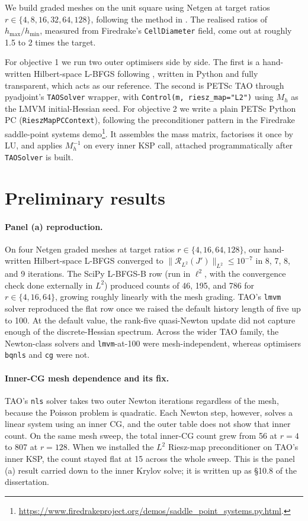 \documentclass[a4paper,11pt]{article}
\newcommand{\Rmap}{\mathcal{R}}
\begin{document}
We build graded meshes on the unit square using Netgen \citep{schoeberl1997} at target ratios $r \in \{4, 8, 16, 32, 64, 128\}$, following the method in \citet[Sect. 2.3]{shfp2017}. The realised ratios of $h_{\max}/h_{\min}$, measured from Firedrake's \texttt{CellDiameter} field, come out at roughly 1.5 to 2 times the target.

For objective 1 we run two outer optimisers side by side. The first is a hand-written Hilbert-space L-BFGS following \citet[Sect. 1.5.4.1]{shfp2017}, written in Python and fully transparent, which acts as our reference. The second is PETSc TAO through pyadjoint's \texttt{TAOSolver} wrapper, with \texttt{Control(m, riesz\_map="L2")} using $M_{h}$ as the LMVM initial-Hessian seed. For objective 2 we write a plain PETSc Python PC (\texttt{RieszMapPCContext}), following the preconditioner pattern in the Firedrake saddle-point systems demo\footnote{\url{https://www.firedrakeproject.org/demos/saddle_point_systems.py.html}.}. It assembles the mass matrix, factorises it once by LU, and applies $M_{h}^{-1}$ on every inner KSP call, attached programmatically after \texttt{TAOSolver} is built.

\section{Preliminary results}

\paragraph{Panel (a) reproduction.} On four Netgen graded meshes at target ratios $r \in \{4, 16, 64, 128\}$, our hand-written Hilbert-space L-BFGS converged to $\|\Rmap_{L^{2}}(J')\|_{L^{2}} \le 10^{-7}$ in 8, 7, 8, and 9 iterations. The SciPy L-BFGS-B row (run in $\ell^{2}$, with the convergence check done externally in $L^{2}$) produced counts of 46, 195, and 786 for $r \in \{4,16,64\}$, growing roughly linearly with the mesh grading. TAO's \texttt{lmvm} solver reproduced the flat row once we raised the default history length of five up to 100. At the default value, the rank-five quasi-Newton update did not capture enough of the discrete-Hessian spectrum. Across the wider TAO family, the Newton-class solvers and \texttt{lmvm}-at-100 were mesh-independent, whereas optimisers \texttt{bqnls} and \texttt{cg} were not.

\paragraph{Inner-CG mesh dependence and its fix.} TAO's \texttt{nls} solver takes two outer Newton iterations regardless of the mesh, because the Poisson problem is quadratic. Each Newton step, however, solves a linear system using an inner CG, and the outer table does not show that inner count. On the same mesh sweep, the total inner-CG count grew from 56 at $r = 4$ to 807 at $r = 128$. When we installed the $L^{2}$ Riesz-map preconditioner on TAO's inner KSP, the count stayed flat at 15 across the whole sweep. This is the panel (a) result carried down to the inner Krylov solve; it is written up as \S 10.8 of the dissertation.
\end{document}
